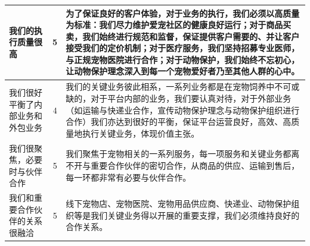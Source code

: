 \documentclass[a4paper]{ctexart}
\begin{document}
\begin{table}[h]
  \centering
\begin{tabular}{|p{3.5cm}|c|p{10cm}|}
  \hline
  我们的执行质量很高 & 5 & 为了保证良好的客户体验，对于业务的执行，我们必须以高质量为标准：我们尽力维护爱宠社区的健康良好运行；对于商品买卖，我们始终进行规范和监督，保证提供客户需要的、并让客户接受我们的定价机制；对于医疗服务，我们坚持招募专业医师，与正规宠物医院进行合作；对于动物保护，我们始终不忘初心，让动物保护理念深入到每一个宠物爱好者乃至其他人群的心中。\\
  \hline
  我们很好平衡了内部业务和外包业务 & 4 & 我们的关键业务彼此相系，一系列业务都是在宠物饲养中不可或缺的，对于平台内部的业务，我们要认真对待，对于外部业务（如运输与快递业合作，宣传动物保护理念与动物保护组织进行合作）我们亦达到很好的平衡，保证平台运营良好，高效、高质量地执行关键业务，体现价值主张。\\
  \hline
  我们很聚焦，必要时与伙伴合作 & 5 & 我们聚焦于宠物相关的一系列服务，每一项服务和关键业务都离不开与重要合作伙伴的密切合作，从商品的供应、运输到售后，每一环都非常有必要与伙伴合作。\\
  \hline
  我们和重要合作伙伴的关系很融洽 & 5 & 线下宠物店、宠物医院、宠物用品供应商、快递业、动物保护组织等是我们关键业务得以开展的重要支撑，我们必须维持良好的合作关系。\\
  \hline
\end{tabular}
\end{table}
\FloatBarrier
\end{document}
